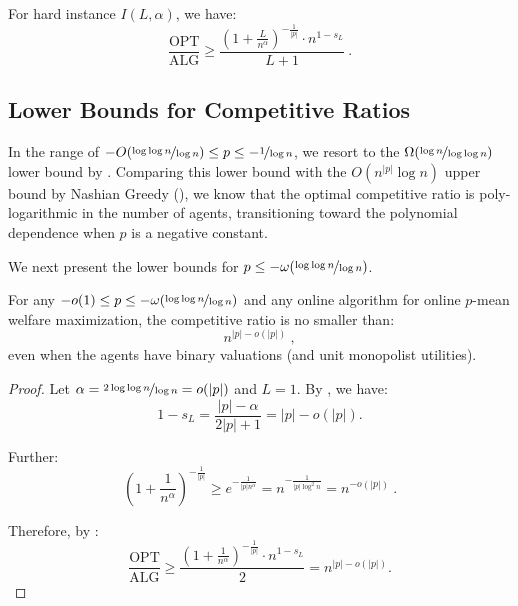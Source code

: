 \documentclass[11pt,letterpaper]{article}
\newcommand{\OPT}{\mathrm{OPT}}
\newcommand{\ALG}{\mathrm{ALG}}
\begin{document}
\begin{corollary}
	\label{cor:hardness-negative}
	For hard instance $I(L, \alpha)$, we have:
	\[
		\frac{\OPT}{\ALG} \ge \frac{\left(1+\frac{L}{n^{\alpha}}\right)^{-\frac{1}{|p|}} \cdot n^{1-s_L}}{L+1}
		~.
	\]
\end{corollary}

\subsection{Lower Bounds for Competitive Ratios}

In the range of $-O(\nicefrac{\log\log n}{\log n}) \le p \le - \nicefrac{1}{\log n}$, we resort to the $\Omega(\nicefrac{\log n}{\log \log n})$ lower bound by .
Comparing this lower bound with the $O(n^{|p|}\log n)$ upper bound by Nashian Greedy (), we know that the optimal competitive ratio is poly-logarithmic in the number of agents, transitioning toward the polynomial dependence when $p$ is a negative constant.

We next present the lower bounds for $p \le - \omega(\nicefrac{\log\log n}{\log n})$.
\begin{theorem}
	\label{thm:hardness-negative-almost-nashian}
	For any $-o(1) \le	p \le - \omega(\nicefrac{\log\log n}{\log n})$ and any online algorithm for online $p$-mean welfare maximization, the competitive ratio is no smaller than:
    \[
    	n^{|p| - o(|p|)}
    	~,
    \]
    even when the agents have binary valuations (and unit monopolist utilities).
\end{theorem}

\begin{proof}
	Let $\alpha = \nicefrac{2\log \log n}{\log n} = o(|p|)$ and $L = 1$.
	By , we have:
	\begin{equation*}
	    1 - s_L = \frac{|p| - \alpha}{2|p| +1} = |p| - o(|p|).
	\end{equation*}
	
	Further:
	\[
		\left(1+\frac{1}{n^{\alpha}}\right)^{-\frac{1}{|p|}} \ge e^{-\frac{1}{|p| n^\alpha}} = n^{-\frac{1}{|p| \log^2 n}} = n^{-o(|p|)}
		~. 
	\]
	
	Therefore, by :
	\begin{equation*}
	    \frac{\OPT}{\ALG} \ge \frac{\left(1+\frac{1}{n^{\alpha}}\right)^{-\frac{1}{|p|}} \cdot n^{1-s_L}}{2} = n^{|p|-o(|p|)}.
	\end{equation*}	
\end{proof}
\end{document}
